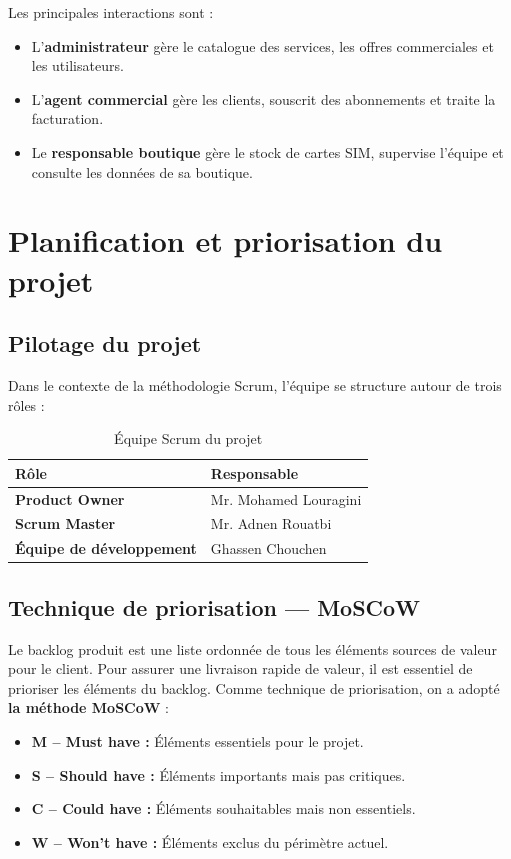 Les principales interactions sont :
\begin{itemize}
    \item L'\textbf{administrateur} gère le catalogue des services, les offres commerciales et les utilisateurs.
    \item L'\textbf{agent commercial} gère les clients, souscrit des abonnements et traite la facturation.
    \item Le \textbf{responsable boutique} gère le stock de cartes SIM, supervise l'équipe et consulte les données de sa boutique.
\end{itemize}


\section{Planification et priorisation du projet}

\subsection{Pilotage du projet}
Dans le contexte de la méthodologie Scrum, l'équipe se structure autour de trois rôles :

\begin{table}[H]
    \centering
    \renewcommand{\arraystretch}{1.3}
    \begin{tabular}{|>{\bfseries}p{6cm}|p{5cm}|}
        \hline
        \textbf{Rôle} & \textbf{Responsable} \\
        \hline
        Product Owner & Mr. Mohamed Louragini  \\ 
        \hline
        Scrum Master & Mr. Adnen Rouatbi \\ 
        \hline
        Équipe de développement & Ghassen Chouchen \\
        \hline
    \end{tabular}
    \caption{Équipe Scrum du projet}
    \label{tab:pilotage_projet}
\end{table}

\subsection{Technique de priorisation --- MoSCoW}
Le backlog produit est une liste ordonnée de tous les éléments sources de valeur pour le client. Pour assurer une livraison rapide de valeur, il est essentiel de prioriser les éléments du backlog.\newline
Comme technique de priorisation, on a adopté \textbf{la méthode MoSCoW} :
\begin{itemize}
    \item[•] \textbf{M -- Must have :} Éléments essentiels pour le projet.
    \item[•] \textbf{S -- Should have :} Éléments importants mais pas critiques.
    \item[•] \textbf{C -- Could have :} Éléments souhaitables mais non essentiels.
    \item[•] \textbf{W -- Won't have :} Éléments exclus du périmètre actuel.
\end{itemize}


